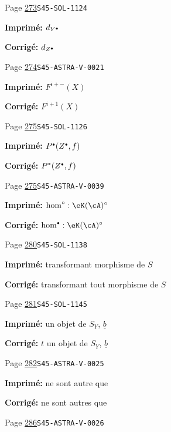 \documentclass[oneside]{book}
\theoremstyle{sga-source}
\theoremstyle{sga-source-dash}
\theoremstyle{sga-source-dotdash}
\theoremstyle{sga-source-number-note-dash}
\theoremstyle{sga-source-note-number-dotdash}
\theoremstyle{sga-source-example-dotdash}
\theoremstyle{sga-source-inline-number}
\theoremstyle{sga-source-bare-number}
\theoremstyle{sga-source}
\let\oldbullet\bullet
\renewcommand{\bullet}{\textnormal{\tiny$\oldbullet$}}
\begin{document}
\begin{description}
\smallskip
\item[\hypertarget{apparatus:FR-0282}{282}] Page \hyperlink{printpage:fr:273}{273}\quad\texttt{S45-SOL-1124}
\par\noindent\textbf{Imprimé:} \(d_{Y^\bullet}\)
\par\noindent\textbf{Corrigé:} \(d_{Z^\bullet}\)
\smallskip
\item[\hypertarget{apparatus:FR-0283}{283}] Page \hyperlink{printpage:fr:274}{274}\quad\texttt{S45-ASTRA-V-0021}
\par\noindent\textbf{Imprimé:} \(F^{i+-}(X)\)
\par\noindent\textbf{Corrigé:} \(F^{i+1}(X)\)
\smallskip
\item[\hypertarget{apparatus:FR-0284}{284}] Page \hyperlink{printpage:fr:275}{275}\quad\texttt{S45-SOL-1126}
\par\noindent\textbf{Imprimé:} \(P^\bullet(Z^\bullet,f)\)
\par\noindent\textbf{Corrigé:} \(P^\ast(Z^\bullet,f)\)
\smallskip
\item[\hypertarget{apparatus:FR-0285}{285}] Page \hyperlink{printpage:fr:275}{275}\quad\texttt{S45-ASTRA-V-0039}
\par\noindent\textbf{Imprimé:} \(\hom^\circ:\eK(\cA)^\circ\)
\par\noindent\textbf{Corrigé:} \(\hom^\bullet:\eK(\cA)^\circ\)
\smallskip
\item[\hypertarget{apparatus:FR-0286}{286}] Page \hyperlink{printpage:fr:280}{280}\quad\texttt{S45-SOL-1138}
\par\noindent\textbf{Imprimé:} transformant morphisme de $S$
\par\noindent\textbf{Corrigé:} transformant tout morphisme de $S$
\smallskip
\item[\hypertarget{apparatus:FR-0287}{287}] Page \hyperlink{printpage:fr:281}{281}\quad\texttt{S45-SOL-1145}
\par\noindent\textbf{Imprimé:} un objet de $S_Y$, $\underline b$
\par\noindent\textbf{Corrigé:} $t$ un objet de $S_Y$, $\underline b$
\smallskip
\item[\hypertarget{apparatus:FR-0288}{288}] Page \hyperlink{printpage:fr:282}{282}\quad\texttt{S45-ASTRA-V-0025}
\par\noindent\textbf{Imprimé:} ne sont autre que
\par\noindent\textbf{Corrigé:} ne sont autres que
\smallskip
\item[\hypertarget{apparatus:FR-0289}{289}] Page \hyperlink{printpage:fr:286}{286}\quad\texttt{S45-ASTRA-V-0026}

\end{description}
\end{document}

